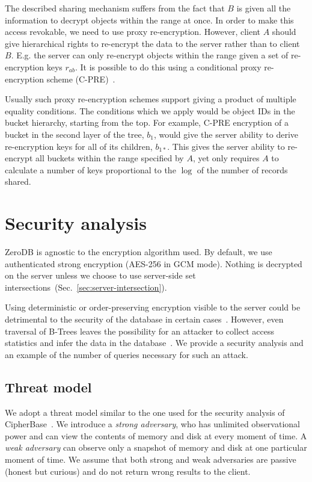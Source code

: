 \documentclass[notitlepage]{revtex4-1}
\begin{document}
The described sharing mechanism suffers from the fact that $B$ is given all the information to decrypt objects within the range at once.
In order to make this access revokable, we need to use proxy re-encryption.
However, client $A$ should give hierarchical rights to re-encrypt the data to the server rather than to client $B$.
E.g. the server can only re-encrypt objects within the range given a set of re-encryption keys $r_{ab}$.
It is possible to do this using a conditional proxy re-encryption scheme (C-PRE)~\cite{conditional-pre-2009,unidirectional-pre-2010,conditional-pre-2014,hierarchical-pre}.

Usually such proxy re-encryption schemes support giving a product of multiple equality conditions.
The conditions which we apply would be object IDs in the bucket hierarchy, starting from the top.
For example, C-PRE encryption of a bucket in the second layer of the tree, $b_1$, would give the server ability to derive re-encryption keys for all of its children, $b_{1*}$.
This gives the server ability to re-encrypt all buckets within the range specified by $A$, yet only requires $A$ to calculate a number of keys proportional to the $\log$ of the number of records shared.

\section{Security analysis}

ZeroDB is agnostic to the encryption algorithm used.
By default, we use authenticated strong encryption ({AES-256} in GCM mode).
Nothing is decrypted on the server unless we choose to use server-side set intersections~(Sec.~\ref{sec:server-intersection}).

Using deterministic or order-preserving encryption visible to the server could be detrimental to the security of the database in certain cases~\cite{cryptdb-hacked}.
However, even traversal of B-Trees leaves the possibility for an attacker to collect access statistics and infer the data in the database~\cite{access-pattern-attack}.
We provide a security analysis and an example of the number of queries necessary for such an attack.

\subsection{Threat model}

We adopt a threat model similar to the one used for the security analysis of CipherBase~\cite{cipherbase}.
We introduce a \emph{strong adversary}, who has unlimited observational power and can view the contents of memory and disk at every moment of time.
A \emph{weak adversary} can observe only a snapshot of memory and disk at one particular moment of time.
We assume that both strong and weak adversaries are passive (honest but curious) and do not return wrong results to the client.
\end{document}
